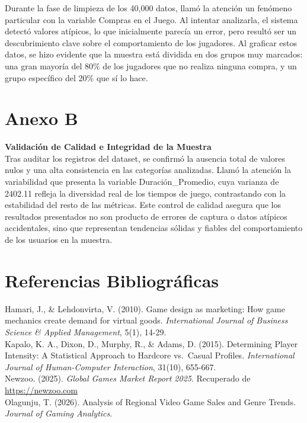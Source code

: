 \documentclass[oneside,11pt]{Latex/Classes/PhDthesisPSnPDF}
\begin{document}
Durante la fase de limpieza de los 40,000 datos, llamó la atención un
fenómeno particular con la variable Compras en el Juego. Al intentar
analizarla, el sistema detectó valores atípicos, lo que inicialmente
parecía un error, pero resultó ser un descubrimiento clave sobre el
comportamiento de los jugadores. Al graficar estos datos, se hizo
evidente que la muestra está dividida en dos grupos muy marcados: una
gran mayoría del 80\% de los jugadores que no realiza ninguna compra, y
un grupo específico del 20\% que sí lo hace.

\chapter{Anexo B}

\textbf{Validación de Calidad e Integridad de la Muestra}\\

Tras auditar los registros del dataset, se confirmó la ausencia total de
valores nulos y una alta consistencia en las categorías analizadas.
Llamó la atención la variabilidad que presenta la variable
Duración\_Promedio, cuya varianza de 2402.11 refleja la diversidad real
de los tiempos de juego, contrastando con la estabilidad del resto de
las métricas. Este control de calidad asegura que los resultados
presentados no son producto de errores de captura o datos atípicos
accidentales, sino que representan tendencias sólidas y fiables del
comportamiento de los usuarios en la muestra.

\chapter{Referencias Bibliográficas}

Hamari, J., \& Lehdonvirta, V. (2010). Game design as marketing: How
game mechanics create demand for virtual goods. \emph{International
Journal of Business Science \& Applied Management}, 5(1), 14-29.\\

Kapalo, K. A., Dixon, D., Murphy, R., \& Adams, D. (2015). Determining
Player Intensity: A Statistical Approach to Hardcore vs.~Casual
Profiles. \emph{International Journal of Human-Computer Interaction},
31(10), 655-667.\\

Newzoo. (2025). \emph{Global Games Market Report 2025}. Recuperado de
\url{https://newzoo.com}\\

Olagunju, T. (2026). Analysis of Regional Video Game Sales and Genre
Trends. \emph{Journal of Gaming Analytics}.\\
\end{document}
